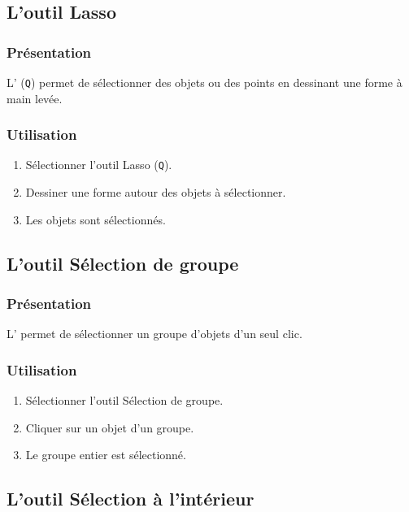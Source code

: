 \subsection{L'outil Lasso}

\subsubsection{Présentation}

L' (\texttt{Q}) permet de sélectionner des objets ou des points en dessinant une forme à main levée.

\subsubsection{Utilisation}

\begin{enumerate}
    \item Sélectionner l'outil Lasso (\texttt{Q}).
    \item Dessiner une forme autour des objets à sélectionner.
    \item Les objets sont sélectionnés.
\end{enumerate}

\subsection{L'outil Sélection de groupe}

\subsubsection{Présentation}

L' permet de sélectionner un groupe d'objets d'un seul clic.

\subsubsection{Utilisation}

\begin{enumerate}
    \item Sélectionner l'outil Sélection de groupe.
    \item Cliquer sur un objet d'un groupe.
    \item Le groupe entier est sélectionné.
\end{enumerate}

\subsection{L'outil Sélection à l'intérieur}

